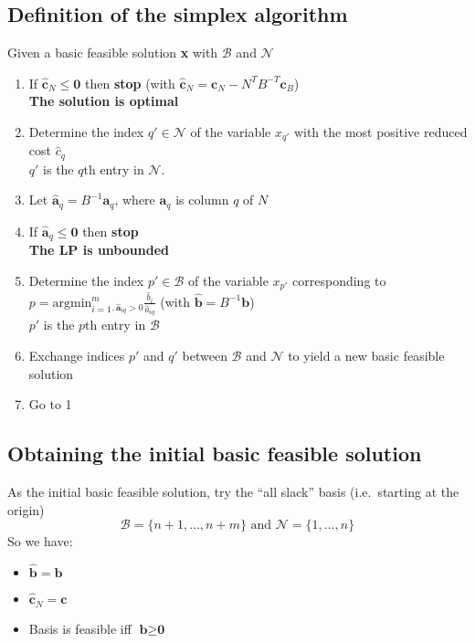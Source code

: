 \documentclass[11pt,a4paper]{article}
\begin{document}
\subsection*{Definition of the simplex algorithm}
Given a basic feasible solution \textbf{x} with $\mathcal{B}$ and $\mathcal{N}$
\begin{enumerate}
    \item If $\widehat{\textbf{c}}_N \le \textbf{0}$ then \textbf{stop} 
		(with $\widehat{\textbf{c}}_N = \textbf{c}_N - N^TB^{-T}\textbf{c}_B$)\\
        \textbf{The solution is optimal}
	\item Determine the index $q' \in \mathcal{N}$ of the variable $x_{q'}$ with the most positive reduced cost $\widehat{c}_q$ \\
		$q'$ is the $q\text{th}$ entry in $\mathcal{N}$.
	\item Let $\widehat{\textbf{a}}_q = B^{-1}\textbf{a}_q$, where $\textbf{a}_q$ is column $q$ of $N$
	\item If $\widehat{\textbf{a}}_q \le \textbf{0}$ then \textbf{stop} \\
		\textbf{The LP is unbounded}
	\item Determine the index $p' \in \mathcal{B}$ of the variable $x_{p'}$ corresponding to $p = \text{argmin}_{i=1}^m_{,\widehat{\textbf{a}}_{iq}>0} \frac{\widehat{b}_i}{\widehat{a}_{iq}}$
		(with $\widehat{\textbf{b}} = B^{-1}\textbf{b}$)\\
		$p'$ is the $p\text{th}$ entry in $\mathcal{B}$
	\item Exchange indices $p'$ and $q'$ between $\mathcal{B}$ and $\mathcal{N}$ to yield a new basic feasible solution
	\item Go to 1
\end{enumerate}

\subsection*{Obtaining the initial basic feasible solution}
As the initial basic feasible solution, try the ``all slack'' basis (i.e.\ starting at the origin)
	$$ \mathcal{B} = \{ n+1, \ldots, n+m \} \text{ and } \mathcal{N} = \{ 1, \ldots, n \}$$
So we have:
\begin{itemize}
	\item $\widehat{\textbf{b}} = \textbf{b}$
	\item $\widehat{\textbf{c}}_N = \textbf{c}$
	\item Basis is feasible iff $\textbf{b} \ge \textbf{0}$
\end{itemize}
\end{document}
